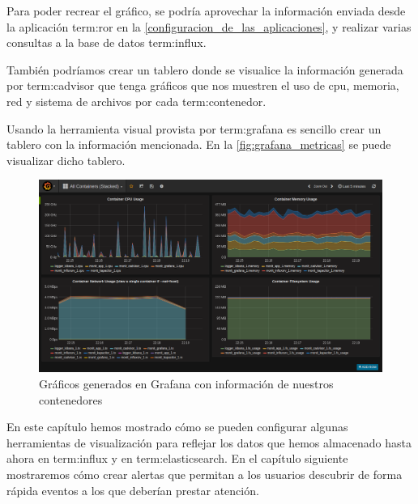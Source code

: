 Para poder recrear el gráfico, se podría aprovechar la información enviada desde
la aplicación \gls{term:ror} en la \autoref{configuracion_de_las_aplicaciones},
y realizar varias consultas a la base de datos \gls{term:influx}.

También podríamos crear un tablero donde se visualice la información generada
por \gls{term:cadvisor} que tenga gráficos que nos muestren el uso de
cpu, memoria, red y sistema de archivos por cada \gls{term:contenedor}.

Usando la herramienta visual provista por \gls{term:grafana} es sencillo crear
un tablero con la información mencionada. En la \autoref{fig:grafana_metricas}
se puede visualizar dicho tablero.

\begin{figure}
  \includegraphics[width=\linewidth]{src/images/05-capitulo-5/grafana_metricas.png}
  \caption{Gráficos generados en Grafana con información de nuestros contenedores}
  \label{fig:grafana_metricas}
\end{figure}

En este capítulo hemos mostrado cómo se pueden configurar algunas herramientas
de visualización para reflejar los datos que hemos almacenado hasta ahora en
\gls{term:influx} y en \gls{term:elasticsearch}. En el capítulo siguiente
mostraremos cómo crear alertas que permitan a los usuarios descubrir de forma
rápida eventos a los que deberían prestar atención.
